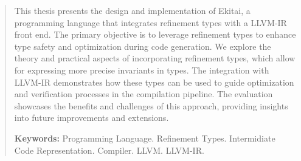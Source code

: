 \documentclass[
  oneside,
  english,
  coorientadorbanca,
  noabntexcite
]{ufsc-thesis-rn46-2019}
\begin{document}
\begin{abstract}
  This thesis presents the design and implementation of Ekitai, a programming language that integrates refinement types with a LLVM-IR front end. The primary objective is to leverage refinement types to enhance type safety and optimization during code generation. We explore the theory and practical aspects of incorporating refinement types, which allow for expressing more precise invariants in types. The integration with LLVM-IR demonstrates how these types can be used to guide optimization and verification processes in the compilation pipeline. The evaluation showcases the benefits and challenges of this approach, providing insights into future improvements and extensions.

  \vspace{\baselineskip}
  \textbf{Keywords:} Programming Language\@. Refinement Types\@. Intermidiate Code Representation\@. Compiler\@. LLVM\@. LLVM-IR\@.
\end{abstract}

\listoffigures*  %

\end{document}
